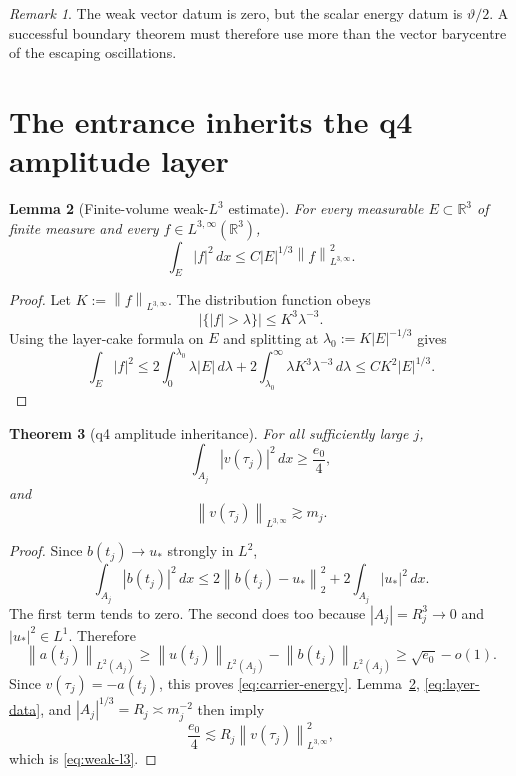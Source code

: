 \documentclass[11pt]{article}
\newtheorem{theorem}{Theorem}
\newtheorem{lemma}[theorem]{Lemma}
\theoremstyle{remark}
\newtheorem{remark}[theorem]{Remark}
\newcommand{\R}{\mathbb R}
\newcommand{\norm}[1]{\left\|#1\right\|}
\begin{document}
\begin{remark}
The weak vector datum is zero, but the scalar energy datum is
\(\vartheta/2\).  A successful boundary theorem must therefore use more
than the vector barycentre of the escaping oscillations.
\end{remark}

\section{The entrance inherits the q4 amplitude layer}

\begin{lemma}[Finite-volume weak-\(L^3\) estimate]
\label{lem:lorentz}
For every measurable \(E\subset\R^3\) of finite measure and every
\(f\in L^{3,\infty}(\R^3)\),
\begin{equation}
\label{eq:lorentz-set}
 \int_E|f|^2\,dx
 \leq C|E|^{1/3}\norm{f}_{L^{3,\infty}}^2.
\end{equation}
\end{lemma}

\begin{proof}
Let \(K:=\norm{f}_{L^{3,\infty}}\).  The distribution function obeys
\[
 |\{|f|>\lambda\}|\leq K^3\lambda^{-3}.
\]
Using the layer-cake formula on \(E\) and splitting at
\(\lambda_0:=K|E|^{-1/3}\) gives
\[
 \int_E|f|^2
 \leq
 2\int_0^{\lambda_0}\lambda|E|\,d\lambda+
 2\int_{\lambda_0}^{\infty}\lambda K^3\lambda^{-3}\,d\lambda
 \leq C K^2|E|^{1/3}.
\]
\end{proof}

\begin{theorem}[q4 amplitude inheritance]
\label{thm:amplitude}
For all sufficiently large \(j\),
\begin{equation}
\label{eq:carrier-energy}
 \int_{A_j}|v(\tau_j)|^2\,dx\geq\frac{e_0}{4},
\end{equation}
and
\begin{equation}
\label{eq:weak-l3}
 \norm{v(\tau_j)}_{L^{3,\infty}}\gtrsim m_j.
\end{equation}
\end{theorem}

\begin{proof}
Since \(b(t_j)\to u_*\) strongly in \(L^2\),
\[
 \int_{A_j}|b(t_j)|^2\,dx
 \leq
 2\norm{b(t_j)-u_*}_2^2+
 2\int_{A_j}|u_*|^2\,dx.
\]
The first term tends to zero.  The second does too because
\(|A_j|=R_j^3\to0\) and \(|u_*|^2\in L^1\).  Therefore
\[
 \norm{a(t_j)}_{L^2(A_j)}
 \geq
 \norm{u(t_j)}_{L^2(A_j)}
 -\norm{b(t_j)}_{L^2(A_j)}
 \geq\sqrt{e_0}-o(1).
\]
Since \(v(\tau_j)=-a(t_j)\), this proves
\eqref{eq:carrier-energy}.  Lemma~\ref{lem:lorentz},
\eqref{eq:layer-data}, and \(|A_j|^{1/3}=R_j\asymp m_j^{-2}\)
then imply
\[
 \frac{e_0}{4}
 \lesssim R_j\norm{v(\tau_j)}_{L^{3,\infty}}^2,
\]
which is \eqref{eq:weak-l3}.
\end{proof}
\end{document}
